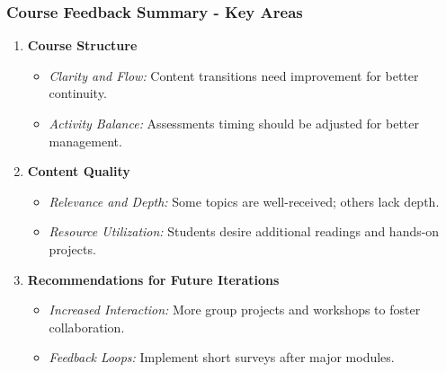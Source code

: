 \documentclass[aspectratio=169]{beamer}
\begin{document}
\begin{frame}[fragile]
    \frametitle{Course Feedback Summary - Key Areas}
    \begin{enumerate}
        \item \textbf{Course Structure}
            \begin{itemize}
                \item \textit{Clarity and Flow:} 
                Content transitions need improvement for better continuity. 
                \item \textit{Activity Balance:} 
                Assessments timing should be adjusted for better management.
            \end{itemize}
        \item \textbf{Content Quality}
            \begin{itemize}
                \item \textit{Relevance and Depth:} 
                Some topics are well-received; others lack depth. 
                \item \textit{Resource Utilization:} 
                Students desire additional readings and hands-on projects.
            \end{itemize}
        \item \textbf{Recommendations for Future Iterations}
            \begin{itemize}
                \item \textit{Increased Interaction:} 
                More group projects and workshops to foster collaboration.
                \item \textit{Feedback Loops:} 
                Implement short surveys after major modules.
            \end{itemize}
    \end{enumerate}
\end{frame}
\end{document}
